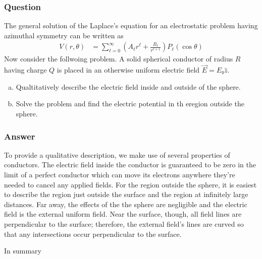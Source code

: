 \subsubsection{Question}

The general solution of the Laplace's equation for an electrostatic problem
having azimuthal symmetry can be written as
\begin{align*}
    V(r,θ) &= \sum_{ℓ=0}^∞ (A_ℓ r^ℓ + \frac{B_ℓ}{r^{ℓ+1}}) P_ℓ(\cos θ)
\end{align*}
Now consider the follwoing problem. A solid spherical conductor of radius $R$
having charge $Q$ is placed in an otherwise uniform electric field $\vec E
= E₀\hat z$.
\begin{enumerate}[(a)]
    \item
        Qualtitatively describe the electric field inside and outside of the
        sphere.
    \item
        Solve the problem and find the electric potential in th eregion outside
        the sphere.
\end{enumerate}

\subsubsection{Answer}

To provide a qualitative description, we make use of several properties of
conductors. The electric field inside the conductor is guaranteed to be zero
in the limit of a perfect conductor which can move its electrons anywhere
they're needed to cancel any applied fields. For the region outside the
sphere, it is easiest to describe the region just outside the surface and
the region at infinitely large distances. Far away, the effects of the the
sphere are negligible and the electric field is the external uniform field.
Near the surface, though, all field lines are perpendicular to the surface;
therefore, the external field's lines are curved so that any intersections
occur perpendicular to the surface.

In summary
\par{}
\vspace{\baselineskip}

